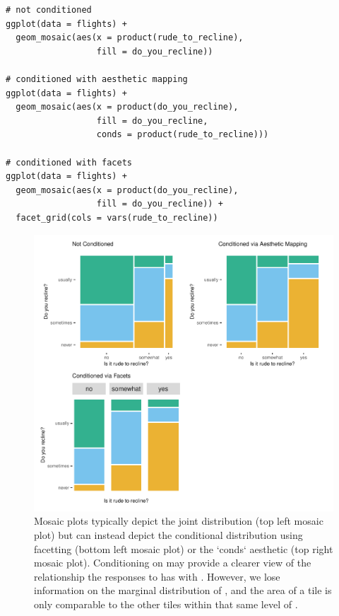 \begin{verbatim}
# not conditioned
ggplot(data = flights) +
  geom_mosaic(aes(x = product(rude_to_recline), 
                  fill = do_you_recline))

# conditioned with aesthetic mapping
ggplot(data = flights) +
  geom_mosaic(aes(x = product(do_you_recline), 
                  fill = do_you_recline, 
                  conds = product(rude_to_recline)))

# conditioned with facets
ggplot(data = flights) +
  geom_mosaic(aes(x = product(do_you_recline), 
                  fill = do_you_recline)) +
  facet_grid(cols = vars(rude_to_recline))
\end{verbatim}

\begin{figure}

{\centering \includegraphics[width=1\linewidth]{jeppson-hofmann_files/figure-latex/conds-1} 

}

\caption{Mosaic plots typically depict the joint distribution (top left mosaic plot) but can instead depict the conditional distribution using facetting (bottom left mosaic plot) or the `conds` aesthetic (top right mosaic plot). Conditioning on  may provide a clearer view of the relationship the responses to  has with . However, we lose information on the marginal distribution of , and the area of a tile is only comparable to the other tiles within that same level of .}\label{fig:conds}
\end{figure}

